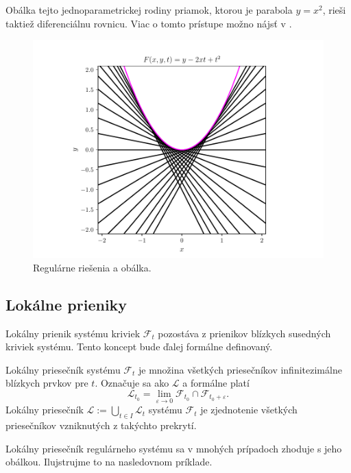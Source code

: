 Obálka tejto jednoparametrickej rodiny priamok, ktorou je parabola $y = x^2$, rieši taktiež diferenciálnu rovnicu. Viac o tomto prístupe možno nájsť v \cite{Gro97}.

\begin{figure}[H]
	\centering
	\includegraphics{images/odr.pdf}
	\caption{Regulárne riešenia a obálka.}
	\label{fig:odr}
\end{figure}

\subsection{Lokálne prieniky} \label{lokalne prieniky pre krivky}
Lokálny prienik systému kriviek $\mathcal{F}_t $ pozostáva z prienikov blízkych susedných kriviek systému. Tento koncept bude ďalej formálne definovaný.
\begin{definition}
Lokálny priesečník systému $\mathcal{F}_t$ je množina všetkých priesečníkov infinitezimálne blízkych prvkov pre $t$. Označuje sa ako $\mathcal{L}$ a formálne platí
$$
\mathcal{L}_{t_0} = \lim_{\varepsilon \to 0} \mathcal{F}_{t_0} \cap \mathcal{F}_{t_0 + \varepsilon}.
$$
Lokálny priesečník $\mathcal{L} := \bigcup_{t \in I} \mathcal{L}_{t}$ systému $\mathcal{F}_t $ je zjednotenie všetkých priesečníkov vzniknutých z takýchto prekrytí.
\end{definition}
Lokálny priesečník regulárneho systému sa v mnohých prípadoch zhoduje s jeho obálkou. Ilujstrujme to na nasledovnom príklade.

